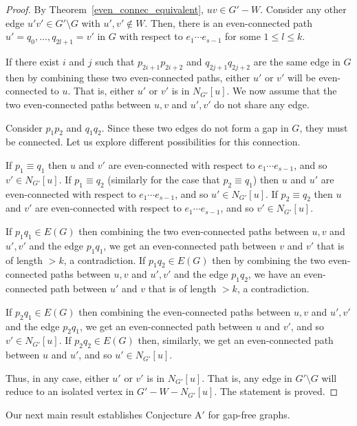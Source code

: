 \documentclass[ALCO,ThmDefs,Unicode,epreuves]{cedram}
\begin{document}
\begin{proof}
By Theorem~\ref{even_connec_equivalent}, $uv \in G' - W$. Consider any other edge $u'v' \in G' \setminus G$ with $u',v' \not\in W$. Then, there is an even-connected path $u' = q_0, \dots, q_{2l+1}=v'$ in $G$ with respect to $e_1 \cdots e_{s-1}$ for some $1 \le l \le k$.

If there exist $i$ and $j$ such that $p_{2i+1}p_{2i+2}$ and $q_{2j+1}q_{2j+2}$ are the same edge in $G$ then by combining these two even-connected paths, either $u'$ or $v'$ will be even-connected to $u$. That is, either $u'$ or $v'$ is in $N_{G'}[u]$. We now assume that the two even-connected paths between $u,v$ and $u',v'$ do not share any edge.

Consider $p_1p_2$ and $q_1q_2$. Since these two edges do not form a gap in $G$, they must be connected. Let us explore different possibilities for this connection.

If $p_1 \equiv q_1$ then $u$ and $v'$ are even-connected with respect to $e_1 \cdots e_{s-1}$, and so $v' \in N_{G'}[u]$. If $p_1 \equiv q_2$ (similarly for the case that $p_2 \equiv q_1$) then $u$ and $u'$ are even-connected with respect to $e_1 \cdots e_{s-1}$, and so $u' \in N_{G'}[u]$. If $p_2 \equiv q_2$ then $u$ and $v'$ are even-connected with respect to $e_1 \cdots e_{s-1}$, and so $v' \in N_{G'}[u]$.

If $p_1q_1 \in E(G)$ then combining the two even-connected paths between $u,v$ and $u',v'$ and the edge $p_1q_1$, we get an even-connected path between $v$ and $v'$ that is of length $>k$, a contradiction. If $p_1q_2 \in E(G)$ then by combining the two even-connected paths between $u,v$ and $u',v'$ and the edge $p_1q_2$, we have an even-connected path between $u'$ and $v$ that is of length $> k$, a contradiction.

If $p_2q_1 \in E(G)$ then combining the even-connected paths between $u,v$ and $u',v'$ and the edge $p_2q_1$, we get an even-connected path between $u$ and $v'$, and so $v' \in N_{G'}[u]$. If $p_2q_2 \in E(G)$ then, similarly, we get an even-connected path between $u$ and $u'$, and so $u' \in N_{G'}[u]$.

Thus, in any case, either $u'$ or $v'$ is in $N_{G'}[u]$. That is, any edge in $G' \setminus G$ will reduce to an isolated vertex in $G'-W-N_{G'}[u]$. The statement is proved.
\end{proof}

Our next main result establishes Conjecture $\text{A}'$ for gap-free graphs.
\end{document}
